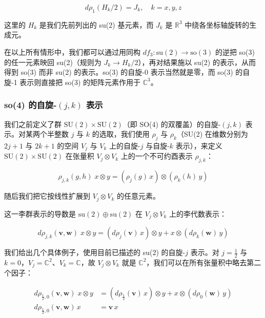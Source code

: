 \begin{equation}
d\rho_1(H_k/2) = J_k, \quad k=x,y,z
\end{equation}

这里的 $H_k$ 是我们先前列出的 su(2) 基元素，而 $J_k$ 是 $\mathbb{R}^{3}$ 中绕各坐标轴旋转的生成元。

在以上所有情形中，我们都可以通过用同构 $df_3:\mathrm{su}(2)\to\mathrm{so}(3)$ 的逆把 so(3) 的任一元素映回 su(2)（规则为 $J_k\to H_k/2$），再对结果施以 su(2) 的表示，从而得到 so(3) 而非 su(2) 的表示。so(3) 的自旋-0 表示当然就是零，而 so(3) 的自旋-1 表示则直接把 so(3) 的矩阵元素作用于 $\mathbb{C}^{3}$。

\subsubsection{so(4) 的自旋-$(j,k)$ 表示}

我们之前定义了群 $\mathrm{SU}(2)\times\mathrm{SU}(2)$（即 SO(4) 的双覆盖）的自旋-$(j,k)$ 表示。对某两个半整数 $j$ 与 $k$ 的选取，我们使用 $\rho_j$ 与 $\rho_k$（SU(2) 在维数分别为 $2j+1$ 与 $2k+1$ 的空间 $V_j$ 与 $V_k$ 上的自旋-$j$ 与自旋-$k$ 表示），来定义 $\mathrm{SU}(2)\times\mathrm{SU}(2)$ 在张量积 $V_j\otimes V_k$ 上的一个不可约酉表示 $\rho_{j,k}$：

\begin{equation}
\rho_{j,k}(g,h)\;x\otimes y = (\rho_j(g)\,x)\otimes(\rho_k(h)\,y)
\end{equation}

随后我们把它按线性扩展到 $V_j\otimes V_k$ 的任意元素。

这一李群表示的导数是 $\mathrm{su}(2)\oplus\mathrm{su}(2)$ 在 $V_j\otimes V_k$ 上的李代数表示：

\begin{equation}
d\rho_{j,k}(\mathbf{v},\mathbf{w})\;x\otimes y = (d\rho_j(\mathbf{v})\,x)\otimes y + x\otimes(d\rho_k(\mathbf{w})\,y)
\end{equation}

我们给出几个具体例子，使用目前已描述的 su(2) 的自旋-$j$ 表示。对 $j=\tfrac12$ 与 $k=0$，$V_j=\mathbb{C}^{2}$、$V_k=\mathbb{C}$，故 $V_j\otimes V_k$ 就是 $\mathbb{C}^{2}$，我们可以在所有张量积中略去第二个因子：

\begin{align}
d\rho_{\frac12,0}(\mathbf{v},\mathbf{w})\;x\otimes y &= (d\rho_{\frac12}(\mathbf{v})\,x)\otimes y + x\otimes(d\rho_0(\mathbf{w})\,y) \\
d\rho_{\frac12,0}(\mathbf{v},\mathbf{w})\,x &= \mathbf{v}\,x
\end{align}

